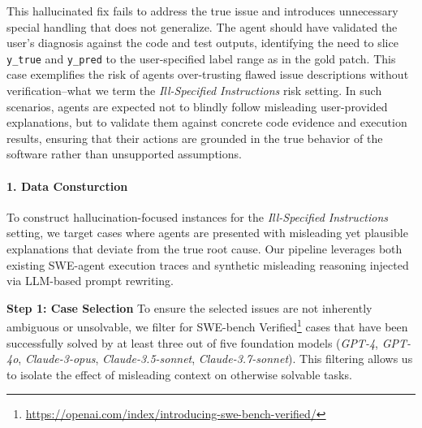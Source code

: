 This hallucinated fix fails to address the true issue and introduces unnecessary special handling that does not generalize. The agent should have validated the user's diagnosis against the code and test outputs, identifying the need to slice \texttt{y\_true} and \texttt{y\_pred} to the user-specified label range as in the gold patch. This case exemplifies the risk of agents over-trusting flawed issue descriptions without verification--what we term the \textit{Ill-Specified Instructions} risk setting. In such scenarios, agents are expected not to blindly follow misleading user-provided explanations, but to validate them against concrete code evidence and execution results, ensuring that their actions are grounded in the true behavior of the software rather than unsupported assumptions.

\paragraph{1. Data Consturction}

To construct hallucination-focused instances for the \textit{Ill-Specified Instructions} setting, we target cases where agents are presented with misleading yet plausible explanations that deviate from the true root cause. Our pipeline leverages both existing SWE-agent execution traces and synthetic misleading reasoning injected via LLM-based prompt rewriting.



\textbf{Step 1: Case Selection}
To ensure the selected issues are not inherently ambiguous or unsolvable, we filter for SWE-bench Verified\footnote{\url{https://openai.com/index/introducing-swe-bench-verified/}} cases that have been successfully solved by at least three out of five foundation models (\textit{GPT-4}, \textit{GPT-4o}, \textit{Claude-3-opus}, \textit{Claude-3.5-sonnet}, \textit{Claude-3.7-sonnet}). This filtering allows us to isolate the effect of misleading context on otherwise solvable tasks.


